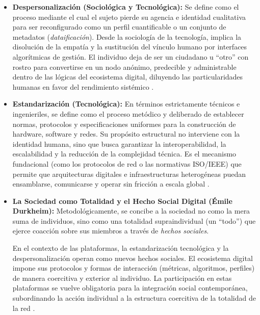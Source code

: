 \begin{itemize}
    \item \textbf{Despersonalización (Sociológica y Tecnológica):} Se define como el
            proceso mediante el cual el sujeto pierde su agencia e identidad cualitativa para ser
            reconfigurado como un perfil cuantificable o un conjunto de metadatos (\textit{dataificación}).
            Desde la sociología de la tecnología, implica la disolución de la empatía y la sustitución
            del vínculo humano por interfaces algorítmicas de gestión. El individuo deja de
            ser un ciudadano u ``otro'' con rostro para convertirse en un nodo anónimo,
            predecible y administrable dentro de las lógicas del ecosistema digital, diluyendo
            las particularidades humanas en favor del rendimiento sistémico \cite{han2014psicopolitica}.

    \item \textbf{Estandarización (Tecnológica):} En términos estrictamente técnicos e ingenieriles,
            se define como el proceso metódico y deliberado de establecer normas, protocolos y
            especificaciones uniformes para la construcción de hardware, software y redes.
            Su propósito estructural no interviene con la identidad humana, sino que busca garantizar
            la interoperabilidad, la escalabilidad y la reducción de la complejidad técnica.
            Es el mecanismo fundacional (como los protocolos de red o las normativas ISO/IEEE)
            que permite que arquitecturas digitales e infraestructuras heterogéneas puedan ensamblarse,
            comunicarse y operar sin fricción a escala global \cite{russell2014open}.

    \item \textbf{La Sociedad como Totalidad y el Hecho Social Digital (Émile Durkheim):} Metodológicamente,
            se concibe a la sociedad no como la mera suma de individuos, sino como una totalidad
            supraindividual (un ``todo'') que ejerce coacción sobre sus miembros a través de
            \textit{hechos sociales}.

    En el contexto de las plataformas, la estandarización tecnológica y la despersonalización operan como
    nuevos hechos sociales. El ecosistema digital impone sus protocolos y formas de interacción
    (métricas, algoritmos, perfiles) de manera coercitiva y exterior al individuo. La participación en
    estas plataformas se vuelve obligatoria para la integración social contemporánea, subordinando la
    acción individual a la estructura coercitiva de la totalidad de la red \cite{durkheim_reglas}.


\end{itemize}
